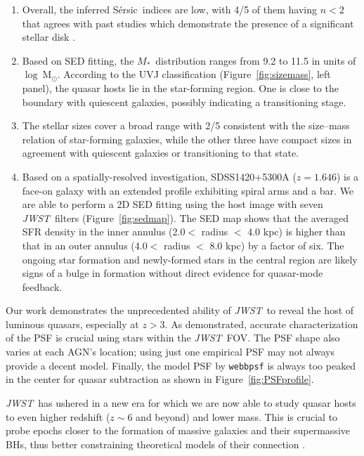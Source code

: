 \documentclass[twocolumn,]{aastex631}
\newcommand{\sersic}{S\'ersic}
\newcommand{\smass}{{$M_*$}}
\newcommand{\jwst}{{\it JWST}}
\newcommand{\todo}[1]{\textcolor{red}{[{\bf TODO}: #1]}}
\begin{document}
\begin{enumerate}

\item Overall, the inferred \sersic\ indices are low, with 4/5 of them having $n<2$ that agrees with past studies which demonstrate the presence of a significant stellar disk \citep[e.g.,][]{Li2021, Zhuang2022}. 

\item Based on SED fitting, the \smass\ distribution ranges from 9.2 to 11.5 in units of $\log~$M$_{\odot}$. According to the UVJ classification (Figure~\ref{fig:sizemass}, left panel), the quasar hosts lie in the star-forming region. One is close to the boundary with quiescent galaxies, possibly indicating a transitioning stage.

\item The stellar sizes cover a broad range with 2/5 consistent with the size--mass relation of star-forming galaxies, while the other three have compact sizes in agreement with quiescent galaxies or transitioning to that state. 

\item Based on a spatially-resolved investigation, SDSS1420+5300A ($z=1.646$) is a face-on galaxy with an extended profile exhibiting spiral arms and a bar. We are able to perform a 2D SED fitting using the host image with seven \jwst\ filters (Figure~\ref{fig:sedmap}). The SED map shows that the averaged SFR density in the inner annulus (2.0$<$ radius $<$ 4.0 kpc) is higher than that in an outer annulus (4.0$<$ radius $<$ 8.0 kpc) by a factor of six. The ongoing star formation and newly-formed stars in the central region are likely signs of a bulge in formation without direct evidence for quasar-mode feedback. 
\end{enumerate}

Our work demonstrates the unprecedented ability of \jwst\ to reveal the host of luminous quasars, especially at $z>3$. As demonstrated, accurate characterization of the PSF is crucial using stars within the \jwst\ FOV. The PSF shape also varies at each AGN's location; using just one empirical PSF may not always provide a decent model. Finally, the model PSF by \texttt{webbpsf} is always too peaked in the center for quasar subtraction as shown in Figure~\ref{fig:PSFprofile}.


\jwst\ has ushered in a new era for which we are now able to study quasar hosts to even higher redshift ($z\sim6$ and beyond) and lower mass. This is crucial to probe epochs closer to the formation of massive galaxies and their supermassive BHs, thus better constraining theoretical models of their connection \citep{Volonteri2021, Ding2022}.
\end{document}

